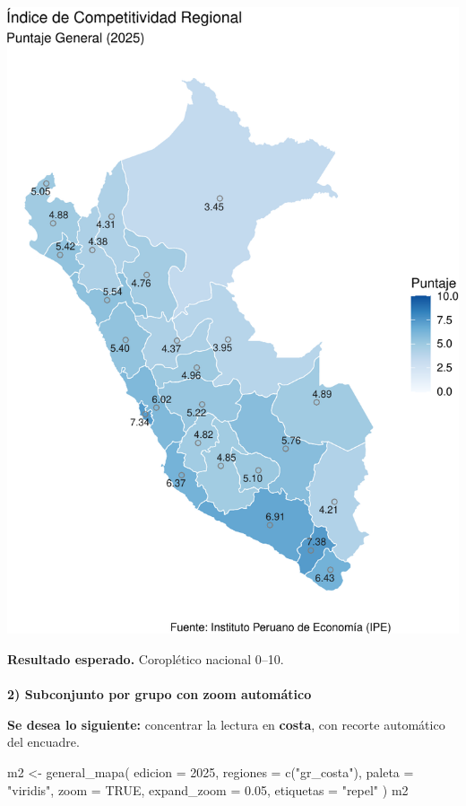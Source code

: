 \documentclass[
  11pt,
  letterpaper,
  DIV=11,
  numbers=noendperiod]{scrartcl}
\makeatletter
\let\oldparagraph\paragraph
\renewcommand{\paragraph}{
    \@ifstar
      \xxxParagraphStar
      \xxxParagraphNoStar
  }
\newcommand{\xxxParagraphStar}[1]{\oldparagraph*{#1}\mbox{}}
\newcommand{\xxxParagraphNoStar}[1]{\oldparagraph{#1}\mbox{}}
\newenvironment{Shaded}{\begin{snugshade}}{\end{snugshade}}
\newcommand{\AttributeTok}[1]{\textcolor[rgb]{0.40,0.45,0.13}{#1}}
\newcommand{\ConstantTok}[1]{\textcolor[rgb]{0.56,0.35,0.01}{#1}}
\newcommand{\DecValTok}[1]{\textcolor[rgb]{0.68,0.00,0.00}{#1}}
\newcommand{\FloatTok}[1]{\textcolor[rgb]{0.68,0.00,0.00}{#1}}
\newcommand{\FunctionTok}[1]{\textcolor[rgb]{0.28,0.35,0.67}{#1}}
\newcommand{\NormalTok}[1]{\textcolor[rgb]{0.00,0.23,0.31}{#1}}
\newcommand{\OtherTok}[1]{\textcolor[rgb]{0.00,0.23,0.31}{#1}}
\newcommand{\StringTok}[1]{\textcolor[rgb]{0.13,0.47,0.30}{#1}}
\makeatother
\begin{document}
\includegraphics{Manual_files/figure-pdf/unnamed-chunk-42-1.pdf}

\textbf{Resultado esperado.} Coroplético nacional 0--10.

\paragraph{\texorpdfstring{\textbf{2) Subconjunto por grupo con zoom
automático}}{2) Subconjunto por grupo con zoom automático}}\label{subconjunto-por-grupo-con-zoom-automuxe1tico}

\textbf{Se desea lo siguiente:} concentrar la lectura en \textbf{costa},
con recorte automático del encuadre.

\begin{Shaded}
\begin{Highlighting}[]
\NormalTok{m2 }\OtherTok{\textless{}{-}} \FunctionTok{general\_mapa}\NormalTok{(}
  \AttributeTok{edicion   =} \DecValTok{2025}\NormalTok{,}
  \AttributeTok{regiones  =} \FunctionTok{c}\NormalTok{(}\StringTok{"gr\_costa"}\NormalTok{),}
  \AttributeTok{paleta    =} \StringTok{"viridis"}\NormalTok{,}
  \AttributeTok{zoom      =} \ConstantTok{TRUE}\NormalTok{,}
  \AttributeTok{expand\_zoom =} \FloatTok{0.05}\NormalTok{,}
  \AttributeTok{etiquetas =} \StringTok{"repel"}
\NormalTok{)}
\NormalTok{m2}
\end{Highlighting}
\end{Shaded}
\end{document}
